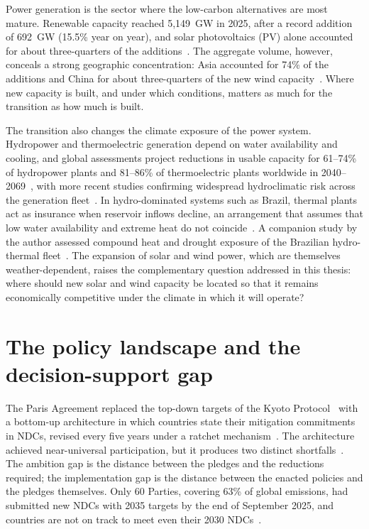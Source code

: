 Power generation is the sector where the low-carbon alternatives are most mature. Renewable capacity reached 5{,}149~GW in 2025, after a record addition of 692~GW (15.5\% year on year), and solar photovoltaics (PV) alone accounted for about three-quarters of the additions~\cite{irena_capacity_highlights2026}. The aggregate volume, however, conceals a strong geographic concentration: Asia accounted for 74\% of the additions and China for about three-quarters of the new wind capacity~\cite{irena_capacity_highlights2026}. Where new capacity is built, and under which conditions, matters as much for the transition as how much is built.

The transition also changes the climate exposure of the power system. Hydropower and thermoelectric generation depend on water availability and cooling, and global assessments project reductions in usable capacity for 61--74\% of hydropower plants and 81--86\% of thermoelectric plants worldwide in 2040--2069~\cite{vanvliet2016_power_generation}, with more recent studies confirming widespread hydroclimatic risk across the generation fleet~\cite{yalew2020_impacts, li2026_global_hydroclimatic, chen2026_water_scarcity}. In hydro-dominated systems such as Brazil, thermal plants act as insurance when reservoir inflows decline, an arrangement that assumes that low water availability and extreme heat do not coincide~\cite{vanvliet2012_vulnerability}. A companion study by the author assessed compound heat and drought exposure of the Brazilian hydro-thermal fleet~\cite{silva2026compound}. %
The expansion of solar and wind power, which are themselves weather-dependent, raises the complementary question addressed in this thesis: where should new solar and wind capacity be located so that it remains economically competitive under the climate in which it will operate?

\section{The policy landscape and the decision-support gap}
\label{sec:policy}

The Paris Agreement replaced the top-down targets of the Kyoto Protocol~\cite{unfccc_kyoto} with a bottom-up architecture in which countries state their mitigation commitments in NDCs, revised every five years under a ratchet mechanism~\cite{unfccc_paris, unfccc_ndcs}. The architecture achieved near-universal participation, but it produces two distinct shortfalls~\cite{IPCC2023Synthesis}. The ambition gap is the distance between the pledges and the reductions required; the implementation gap is the distance between the enacted policies and the pledges themselves. Only 60 Parties, covering 63\% of global emissions, had submitted new NDCs with 2035 targets by the end of September 2025, and countries are not on track to meet even their 2030 NDCs~\cite{UNEP2025EmissionsGap}.

